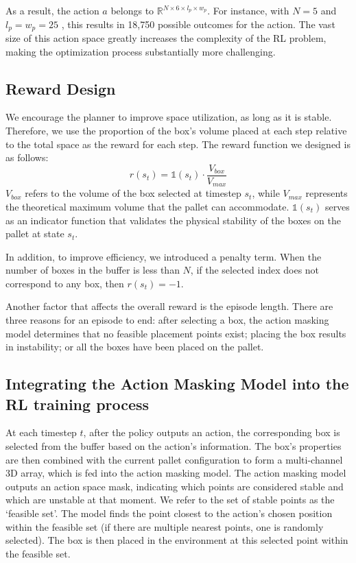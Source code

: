As a result, the action $a$ belongs to $ \mathbb{R}^{N \times 6 \times l_p \times w_p} $. For instance, with $N=5$ and $l_p=w_p=25$ \cite{wu2024efficient}, this results in 18,750 possible outcomes for the action. The vast size of this action space greatly increases the complexity of the RL problem, making the optimization process substantially more challenging.

\subsection{Reward Design}
We encourage the planner to improve space utilization, as long as it is stable. Therefore, we use the proportion of the box's volume placed at each step relative to the total space as the reward for each step. The reward function we designed is as follows:
\begin{equation}
    r(s_t) = \mathbb{1}(s_t) \cdot \frac{V_{box}}{V_{max}}
\end{equation}
$V_{box}$ refers to the volume of the box selected at timestep $s_t$, while $V_{max}$ represents the theoretical maximum volume that the pallet can accommodate. $\mathbb{1}(s_t)$ serves as an indicator function that validates the physical stability of the boxes on the pallet at state $s_t$.

In addition, to improve efficiency, we introduced a penalty term. When the number of boxes in the buffer is less than $N$, if the selected index does not correspond to any box, then $r(s_t)= -1$.

Another factor that affects the overall reward is the episode length. There are three reasons for an episode to end: after selecting a box, the action masking model determines that no feasible placement points exist; placing the box results in instability; or all the boxes have been placed on the pallet.

\subsection{Integrating the Action Masking Model into the RL training process}
At each timestep $t$, after the policy outputs an action, the corresponding box is selected from the buffer based on the action's information. The box's properties are then combined with the current pallet configuration to form a multi-channel 3D array, which is fed into the action masking model. The action masking model outputs an action space mask, indicating which points are considered stable and which are unstable at that moment. We refer to the set of stable points as the `feasible set'. The model finds the point closest to the action’s chosen position within the feasible set (if there are multiple nearest points, one is randomly selected). The box is then placed in the environment at this selected point within the feasible set.

